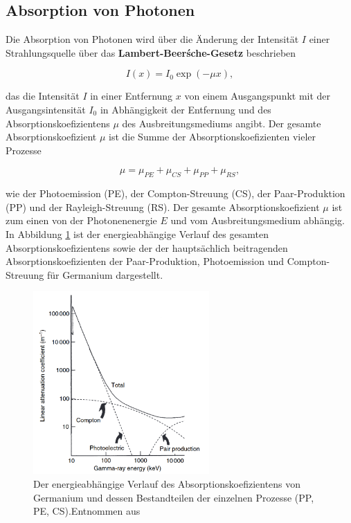       \subsection{Absorption von Photonen}
        Die Absorption von Photonen wird über die Änderung der Intensität $I$ einer Strahlungsquelle über das \textbf{Lambert-Beerśche-Gesetz} beschrieben

        \begin{equation}
          I(x) = I_0 \exp\left(-\mu x\right),
        \label{eqn:absorptionsgesetz}
        \end{equation}

        das die Intensität $I$ in einer Entfernung $x$ von einem Ausgangspunkt mit der Ausgangsintensität $I_0$ in Abhängigkeit der Entfernung und des Absorptionskoefizientens $\mu$ des Ausbreitungsmediums 
        angibt. Der gesamte Absorptionskoefizient $\mu$ ist die Summe der Absorptionskoefizienten vieler Prozesse
        
        \begin{equation*}
          \mu = \mu_{PE} + \mu_{CS} + \mu_{PP} + \mu_{RS},
        \end{equation*}

        wie der Photoemission (PE), der Compton-Streuung (CS), der Paar-Produktion (PP) und der Rayleigh-Streuung (RS). Der gesamte Absorptionskoefizient $\mu$ ist zum einen von der Photonenenergie $E$ und 
        vom Ausbreitungsmedium abhängig. In Abbildung \ref{fig:absorptionskoeffizient} ist der energieabhängige Verlauf des gesamten Absorptionskoefizientens sowie der der hauptsächlich beitragenden 
        Absorptionskoefizienten der Paar-Produktion, Photoemission und Compton-Streuung für Germanium dargestellt. 

        \FloatBarrier

        \begin{figure}[h]
          \centering
          \includegraphics[width = 0.6\textwidth]{pictures/absorptionskoeffizient.png}
          \caption{Der energieabhängige Verlauf des Absorptionskoefizientens von Germanium und dessen Bestandteilen der einzelnen Prozesse (PP, PE, CS).Entnommen aus \cite{gilmore_practical_2008}}
          \label{fig:absorptionskoeffizient}
        \end{figure}
    
